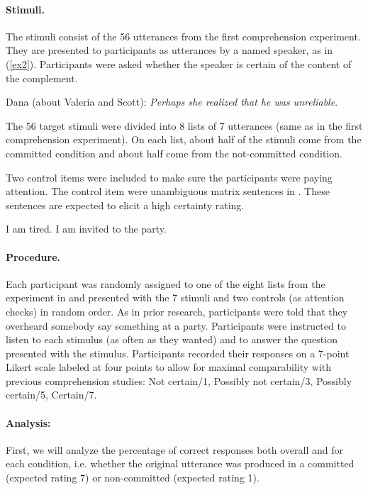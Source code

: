 \documentclass[dina4,12pt,fleqn]{article}
\newcommand{\6}{\mbox{$[\hspace*{-.6mm}[$}}
\newcommand{\9}{\mbox{$]\hspace*{-.6mm}]$}}
\begin{document}
\paragraph{Stimuli.} The stimuli consist of the 56 utterances from the first comprehension experiment. They are presented to participants as utterances by a named speaker, as in (\ref{ex2}). Participants were asked whether the speaker is certain of the content of the complement.

\begin{exe}
\ex\label{ex2} Dana (about Valeria and Scott): {\em Perhaps she realized that he was unreliable}.
\end{exe}

The 56 target stimuli were divided into 8 lists of 7 utterances (same as in the first comprehension experiment). On each list, about half of the stimuli come from the committed condition and about half come from the not-committed condition. 

Two control items were included to make sure the participants were paying attention. The control item were unambiguous matrix sentences in \label{controlsExp1}. These sentences are expected to elicit a high certainty rating.

\begin{exe}
\ex\label{controlsExp1} 
\begin{xlist}
\ex I am tired.
\ex I am invited to the party.
\end{xlist}
\end{exe}

\paragraph{Procedure.} Each participant was randomly assigned to one of the eight lists from the experiment in and presented with the 7 stimuli  and two controls (as attention checks) in random order. As in prior research, participants were told that they overheard somebody say something at a party. Participants were instructed to listen to each stimulus (as often as they wanted) and to answer the question presented with the stimulus. Participants recorded their responses on a 7-point Likert scale labeled at four points to allow for maximal comparability with previous comprehension studies: Not certain/1, Possibly not certain/3, Possibly certain/5, Certain/7.



\paragraph{Analysis:} First, we will analyze the percentage of correct responses both overall and for each condition, i.e. whether the original utterance was produced in a committed (expected rating 7) or non-committed (expected rating 1). \\
\end{document}
